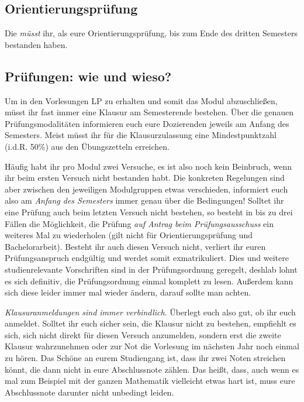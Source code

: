 \subsection{Orientierungsprüfung}

Die  \emph{müsst} ihr, als eure Orientierungsprüfung, bis zum Ende des dritten Semesters bestanden haben.


\subsection{Prüfungen: wie und wieso?}

Um in den Vorlesungen \gls{LP} zu erhalten und somit das Modul abzuschließen, müsst ihr fast immer eine Klausur am Semesterende bestehen. Über die genauen Prüfungsmodalitäten informieren euch eure Dozierenden jeweils am Anfang des Semesters. Meist müsst ihr für die Klausurzulassung eine Mindestpunktzahl (i.d.R. 50\%) aus den Übungszetteln erreichen.

Häufig habt ihr pro Modul zwei Versuche, es ist also noch kein Beinbruch, wenn ihr beim ersten Versuch nicht bestanden habt. Die konkreten Regelungen sind aber zwischen den jeweiligen Modulgruppen etwas verschieden, informiert euch also am \emph{Anfang des Semesters} immer genau über die Bedingungen! Solltet ihr eine Prüfung auch beim letzten Versuch nicht bestehen, so besteht in bis zu drei Fällen die Möglichkeit, die Prüfung \emph{auf Antrag beim Prüfungsausschuss} ein weiteres Mal zu wiederholen (gilt nicht für Orientierungsprüfung und Bachelorarbeit). Besteht ihr auch diesen Versuch nicht, verliert ihr euren Prüfungsanspruch endgültig und werdet somit exmatrikuliert. Dies und weitere studienrelevante Vorschriften sind in der Prüfungsordnung geregelt, deshlab lohnt es sich definitiv, die Prüfungsordnung einmal komplett zu lesen. Außerdem kann sich diese leider immer mal wieder ändern, darauf sollte man achten.

\emph{Klausuranmeldungen sind immer verbindlich}. Überlegt euch also gut, ob ihr euch anmeldet. Solltet ihr euch sicher sein, die Klausur nicht zu bestehen, empfiehlt es sich, sich nicht direkt für diesen Versuch anzumelden, sondern erst die zweite Klausur wahrzunehmen oder zur Not die Vorlesung im nächsten Jahr noch einmal zu hören. Das Schöne an eurem Studiengang ist, dass ihr zwei Noten streichen könnt, die dann nicht in eure Abschlussnote zählen. Das heißt, dass, auch wenn es mal zum Beispiel mit der ganzen Mathematik vielleicht etwas hart ist, muss eure Abschlussnote darunter nicht unbedingt leiden.

